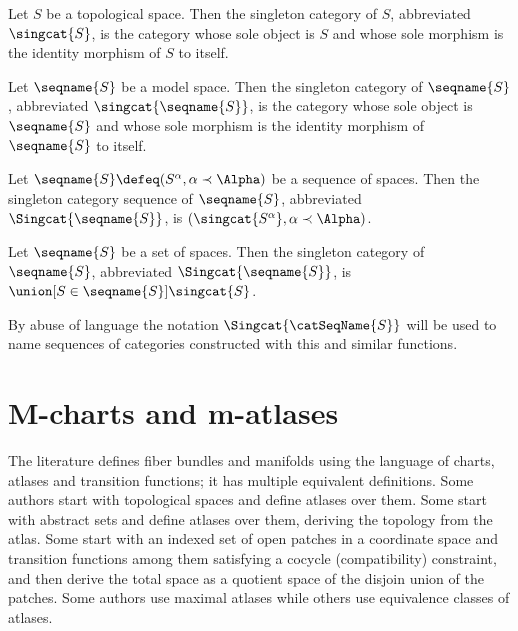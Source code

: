 \documentclass{article}
\begin{document}
\begin{definition}
\label {def:singcat}
Let $S$ be a topological space. Then the singleton category of $S$,
abbreviated $\singcat{S}$, is the category whose sole object is $S$ and
whose sole morphism is the identity morphism of $S$ to itself.

Let $\seqname{S}$ be a model space. Then the singleton category of
$\seqname{S}$, abbreviated $\singcat{\seqname{S}}$, is the category whose
sole object is $\seqname{S}$ and whose sole morphism is the identity
morphism of $\seqname{S}$ to itself.

Let $\seqname{S} \defeq (S^\alpha, \alpha \prec \Alpha)$ be a sequence
of spaces. Then the singleton category sequence of $\seqname{S}$,
abbreviated $\Singcat{\seqname{S}}$, is
$(\singcat{S^\alpha}, \alpha \prec \Alpha)$.

Let $\seqname{S}$ be a set of spaces. Then the singleton category of
$\seqname{S}$, abbreviated $\Singcat{\seqname{S}}$, is
$\union[S \in \seqname{S}]{\singcat{S}}$.

\begin{remark}
By abuse of language the notation $\Singcat{\catSeqName{S}}$ will be used
to name sequences of categories constructed with this and similar
functions.
\end{remark}
\end{definition}

%

\part{M-charts and m-atlases}
\label{part:M-charts}
The literature defines fiber bundles and manifolds using the language of
charts, atlases and transition functions; it has multiple equivalent
definitions. Some authors start with topological spaces and define
atlases over them. Some start with abstract sets and define atlases over
them, deriving the topology from the atlas. Some start with an indexed
set of open patches in a coordinate space and transition functions among
them satisfying a cocycle (compatibility) constraint, and then derive
the total space as a quotient space of the disjoin union of the patches.
Some authors use maximal atlases while others use equivalence classes of
atlases.
\end{document}

